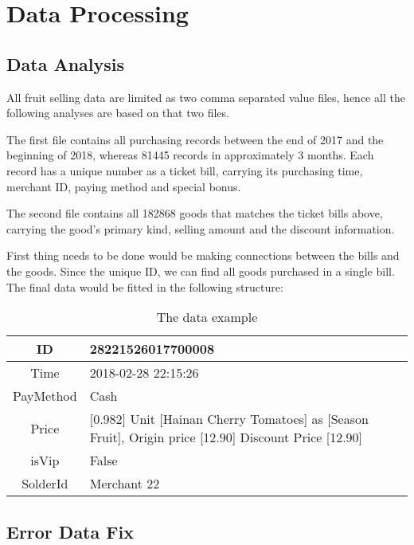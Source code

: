 \documentclass{mcmthesis}
\begin{document}
\section{Data Processing}

\subsection{Data Analysis}

All fruit selling data are limited as two comma separated value files,
hence all the following analyses are based on that two files.

The first file contains all purchasing records between the end of 2017 and the beginning of 2018, whereas 81445 records in approximately 3 months. Each record has a unique number as a ticket bill, carrying its purchasing time, merchant ID, paying method and special bonus.

The second file contains all 182868 goods that matches the ticket bills above, carrying the good's primary kind, selling amount and the discount information.

First thing needs to be done would be making connections between the bills and the goods. Since the unique ID, we can find all goods purchased in a single bill. The
final data would be fitted in the following structure:

\begin{table}
    \centering
    \caption{The data example} \label{table-data_example}
    \begin{tabular}{|c|p{20em}|}
    \hline
        ID & 28221526017700008\\
    \hline
        Time & 2018-02-28 22:15:26\\
    \hline
        PayMethod & Cash\\
    \hline
        Price & [0.982] Unit [Hainan Cherry Tomatoes] as [Season Fruit], Origin price [12.90] Discount Price [12.90]\\
    \hline
        isVip & False\\
    \hline
        SolderId & Merchant 22\\

    \hline
    \end{tabular}
\end{table}

\subsection{Error Data Fix}
\end{document}
